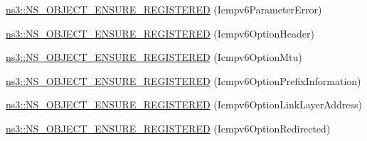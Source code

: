 \begin{DoxyCompactItemize}
\item 
\hyperlink{namespacens3_a3bd3acc4df3654701b2ebd213d51703d}{ns3\+::\+N\+S\+\_\+\+O\+B\+J\+E\+C\+T\+\_\+\+E\+N\+S\+U\+R\+E\+\_\+\+R\+E\+G\+I\+S\+T\+E\+R\+ED} (Icmpv6\+Parameter\+Error)
\item 
\hyperlink{namespacens3_ac482d4ed957b6058ed40a308c8d6ce1f}{ns3\+::\+N\+S\+\_\+\+O\+B\+J\+E\+C\+T\+\_\+\+E\+N\+S\+U\+R\+E\+\_\+\+R\+E\+G\+I\+S\+T\+E\+R\+ED} (Icmpv6\+Option\+Header)
\item 
\hyperlink{namespacens3_a96fe899bb1e653e2557fc956c0445ef3}{ns3\+::\+N\+S\+\_\+\+O\+B\+J\+E\+C\+T\+\_\+\+E\+N\+S\+U\+R\+E\+\_\+\+R\+E\+G\+I\+S\+T\+E\+R\+ED} (Icmpv6\+Option\+Mtu)
\item 
\hyperlink{namespacens3_a3f2573c54600db66a74b49ce801bbf62}{ns3\+::\+N\+S\+\_\+\+O\+B\+J\+E\+C\+T\+\_\+\+E\+N\+S\+U\+R\+E\+\_\+\+R\+E\+G\+I\+S\+T\+E\+R\+ED} (Icmpv6\+Option\+Prefix\+Information)
\item 
\hyperlink{namespacens3_a8a5c9eaa90c146a78b691deac46e8ffd}{ns3\+::\+N\+S\+\_\+\+O\+B\+J\+E\+C\+T\+\_\+\+E\+N\+S\+U\+R\+E\+\_\+\+R\+E\+G\+I\+S\+T\+E\+R\+ED} (Icmpv6\+Option\+Link\+Layer\+Address)
\item 
\hyperlink{namespacens3_a263463e0d5ce1df86257ee12653d19eb}{ns3\+::\+N\+S\+\_\+\+O\+B\+J\+E\+C\+T\+\_\+\+E\+N\+S\+U\+R\+E\+\_\+\+R\+E\+G\+I\+S\+T\+E\+R\+ED} (Icmpv6\+Option\+Redirected)
\end{DoxyCompactItemize}
